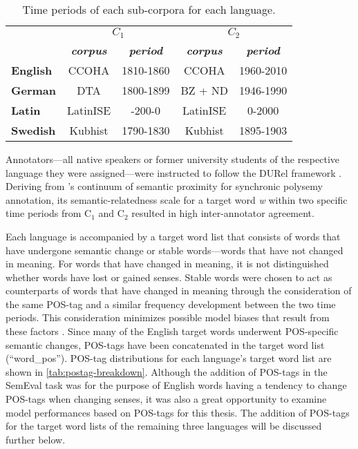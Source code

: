 \begin{table}[h]
\centering
\begin{tabular}{lcccc} 
\toprule
\textbf{}        & \multicolumn{2}{c}{\textbf{$C_1$}}                  & \multicolumn{2}{c}{\textbf{$C_2$}}                   \\
                 & \textit{\textbf{corpus}} & \textit{\textbf{period}} & \textit{\textbf{corpus}} & \textit{\textbf{period}}  \\ 
\cline{2-5}
\textbf{English} & CCOHA                    & 1810-1860                & CCOHA                    & 1960-2010                 \\
\textbf{German}  & DTA                      & 1800-1899                & BZ + ND                  & 1946-1990                 \\
\textbf{Latin}   & LatinISE                 & -200-0                   & LatinISE                 & 0-2000                    \\
\textbf{Swedish} & Kubhist                  & 1790-1830                & Kubhist                  & 1895-1903                 \\
\bottomrule
\end{tabular}
\caption{Time periods of each sub-corpora for each language.}
\label{tab:subcorpora-timeNEW}
\end{table}

Annotators—all native speakers or former university students of the respective language they were assigned—were instructed to follow the DURel framework \citep{DURel2018}. Deriving from \citet{blank1997prinzipien}’s continuum of semantic proximity for synchronic polysemy annotation, its semantic-relatedness scale for a target word \emph{w} within two specific time periods from C$_1$ and C$_2$ resulted in high inter-annotator agreement. 
	
Each language is accompanied by a target word list that consists of words that have undergone semantic change or stable words—words that have not changed in meaning. For words that have changed in meaning, it is not distinguished whether words have lost or gained senses. Stable words were chosen to act as counterparts of words that have changed in meaning through the consideration of the same POS-tag and a similar frequency development between the two time periods. This consideration minimizes possible model biases that result from these factors \citep{dubossarsky-etal-2017-outta}. Since many of the English target words underwent POS-specific semantic changes, POS-tags have been concatenated in the target word list (“word\_pos”). POS-tag distributions for each language's target word list are shown in \autoref{tab:postag-breakdown}. Although the addition of POS-tags in the SemEval task was for the purpose of English words having a tendency to change POS-tags when changing senses, it was also a great opportunity to examine model performances based on POS-tags for this thesis. The addition of POS-tags for the target word lists of the remaining three languages will be discussed further below.
 
